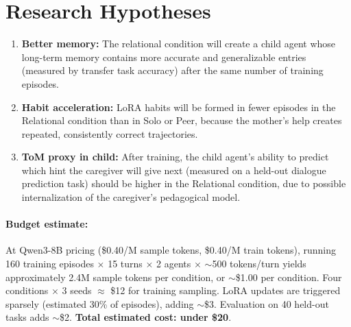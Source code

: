 \documentclass[11pt]{article}
\begin{document}
\section{Research Hypotheses}

\begin{enumerate}[label=\textbf{H\arabic*.}]
    \item \textbf{Better memory:} The relational condition will create a child agent whose long-term memory contains more accurate and generalizable entries (measured by transfer task accuracy) after the same number of training episodes.

    \item \textbf{Habit acceleration:} LoRA habits will be formed in fewer episodes in the Relational condition than in Solo or Peer, because the mother's help creates repeated, consistently correct trajectories.

    \item \textbf{ToM proxy in child:} After training, the child agent's ability to predict which hint the caregiver will give next (measured on a held-out dialogue prediction task) should be higher in the Relational condition, due to possible internalization of the caregiver's pedagogical model.
\end{enumerate}

\paragraph{Budget estimate:}
At Qwen3-8B pricing (\$0.40/M sample tokens, \$0.40/M train tokens), running 160 training episodes $\times$ 15 turns $\times$ 2 agents $\times$ $\sim$500 tokens/turn yields approximately 2.4M sample tokens per condition, or $\sim$\$1.00 per condition. Four conditions $\times$ 3 seeds $\approx$ \$12 for training sampling. LoRA updates are triggered sparsely (estimated 30\% of episodes), adding $\sim$\$3. Evaluation on 40 held-out tasks adds $\sim$\$2. \textbf{Total estimated cost: under \$20}.



\end{document}
